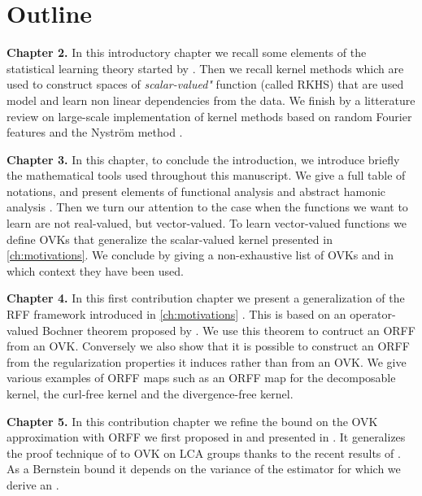 \section{Outline}
\textbf{Chapter 2.}
In this introductory chapter we recall some elements of the statistical
learning theory started by \citet{Vapnik1998}. Then we recall kernel methods
\citep{Aronszajn1950} which are used to construct spaces of
\emph{scalar-valued"} function (called RKHS) that are used model and learn non
linear dependencies from the data. We finish by a litterature review on
large-scale implementation of kernel methods based on random Fourier features
\citep{Rahimi2007} and the Nystr\"om method \citep{Williams2000-nystrom}.

\textbf{Chapter 3.}
In this chapter, to conclude the introduction, we introduce briefly the
mathematical tools used throughout this manuscript. We give a full table of
notations, and present elements of functional analysis
\citep{kurdila2006convex} and abstract hamonic analysis
\citep{folland1994course}. Then we turn our attention to the case when the
functions we want to learn are not real-valued, but vector-valued.  To learn
vector-valued functions we define \aclp{OVK} \citep{Micchelli2005, Carmeli2010}
that generalize the scalar-valued kernel presented in \cref{ch:motivations}. We
conclude by giving a non-exhaustive list of \aclp{OVK} and in which context
they have been used.

\textbf{Chapter 4.}
In this first contribution chapter we present a generalization of the \acs{RFF}
framework introduced in \cref{ch:motivations} \citep{brault2016random}. This is
based on an operator-valued Bochner theorem proposed by \citet{Carmeli2010}. We
use this theorem to contruct an \acf{ORFF} from an \acs{OVK}. Conversely we
also show that it is possible to construct an \acs{ORFF} from the
regularization properties it induces rather than from an \acs{OVK}. We give
various examples of \acs{ORFF} maps such as an \acs{ORFF} map for the
decomposable kernel, the curl-free kernel and the divergence-free kernel.

\textbf{Chapter 5.} 
In this contribution chapter we refine the bound on the \ac{OVK} approximation
with \ac{ORFF} we first proposed in \cite{brault2016random} and presented in
\cite{braultborne}. It generalizes the proof technique of \citet{Rahimi2007} to
\ac{OVK} on \ac{LCA} groups thanks to the recent results of
\citet{sutherland2015, tropp2015introduction, minsker2011some,
koltchinskii2013remark}. As a Bernstein bound it depends on the variance of the
estimator for which we derive an .

